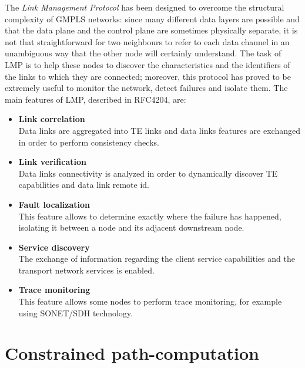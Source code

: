 \documentclass[10pt,a4paper]{report}
\begin{document}
The \textit{Link Management Protocol} has been designed to overcome
the structural complexity of GMPLS networks: since many different data
layers are possible and that the data plane and the control plane are
sometimes physically separate, it is not that straightforward for two
neighbours to refer to each data channel in an unambiguous way that
the other node will certainly understand. The task of LMP is to help
these nodes to discover the characteristics and the identifiers of the
links to which they are connected; moreover, this protocol has proved
to be extremely useful to monitor the network, detect failures and
isolate them. The main features of LMP, described in RFC4204, are:
\begin{itemize}
\item \textbf{Link correlation} \\
  Data links are aggregated into TE links and data links features are
  exchanged in order to perform consistency checks.
\item \textbf{Link verification} \\
  Data links connectivity is analyzed in order to dynamically discover
  TE capabilities and data link remote id.
\item \textbf{Fault localization} \\
  This feature allows to determine exactly where the failure has
  happened, isolating it between a node and its adjacent downstream
  node.
\item \textbf{Service discovery} \\
  The exchange of information regarding the client service
  capabilities and the transport network services is enabled.
\item \textbf{Trace monitoring} \\
  This feature allows some nodes to perform trace monitoring, for
  example using SONET/SDH technology.
\end{itemize}

\chapter{Constrained path-computation}
\end{document}

